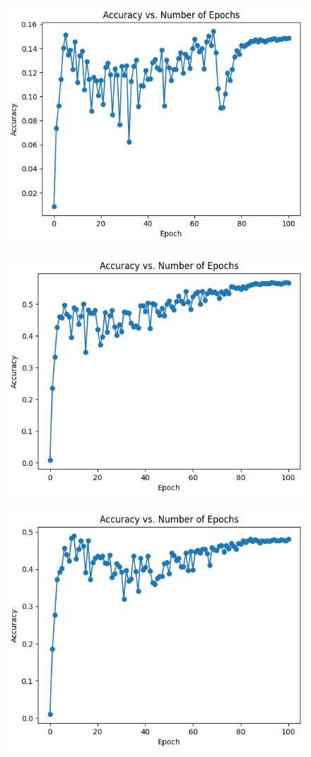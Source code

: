 \documentclass{article}
\begin{document}
\begin{figure}[h]
\centering
\begin{minipage}{.5\textwidth}
  \centering
  \includegraphics[width=.6\linewidth]{assets/gumbel_softmax_ae.png}
  \newline
  \noindent
  \label{fig:test1}
\end{minipage}%
\begin{minipage}{.5\textwidth}
  \centering
  \includegraphics[width=.6\linewidth]{assets/log_gumbel_softmax_ae.png}
  \newline
  \noindent
  \label{fig:test2}
\end{minipage}
\end{figure}
\begin{figure}[!h]
\centering
\begin{minipage}{.5\textwidth}
  \centering
  \includegraphics[width=.6\linewidth]{assets/log_taylor_softmax_ae.png}
  \newline
  \noindent
  \label{fig:test2}
\end{minipage}
\end{figure}
\end{document}
